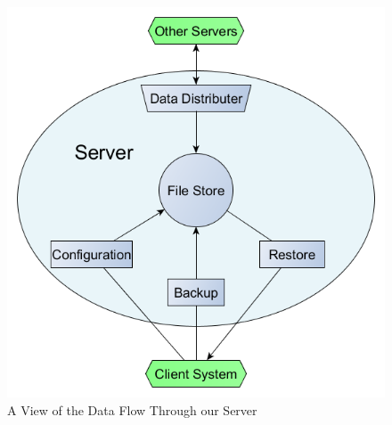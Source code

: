 \begin{figure}[hb]
\centering
\includegraphics[scale=0.5]{images/architechure-diagram2.png}
\caption{A View of the Data Flow Through our Server}
\label{fig:clientServer}
\end{figure}
